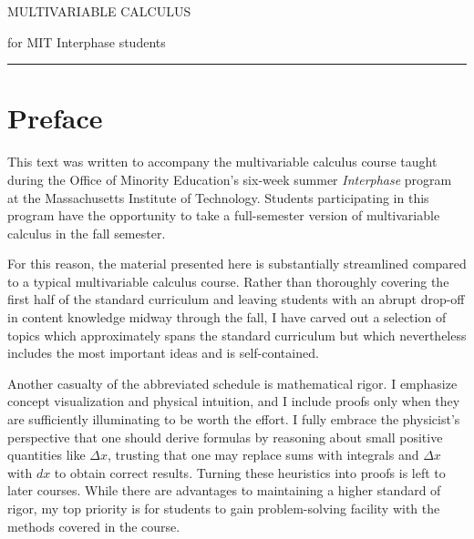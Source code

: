 \documentclass[svgnames]{report}
\begin{document}
 

\begin{titlepage} 
  \pagecolor{softblue}
  {\titlefont \color{MidnightBlue} MULTIVARIABLE CALCULUS} 
  
  \vspace*{5mm} 
  { \hspace*{9cm} \subtitlefont for MIT Interphase students} \par
  \null\vfill
  \vspace*{1cm}
  \noindent
  \hfill
  \begin{minipage}{0.35\linewidth}
    \begin{flushright}
      \printauthor
    \end{flushright}
  \end{minipage}
  \begin{minipage}{0.02\linewidth}
    \rule{1pt}{125pt}
  \end{minipage}
  \titlepagedecoration
\end{titlepage}


\chapter*{Preface} 

\pagecolor{white} 

This text was written to accompany the multivariable calculus course
taught during the Office of Minority Education's six-week summer
\textit{Interphase} program at the Massachusetts Institute of
Technology. Students participating in this program have the
opportunity to take a full-semester version of multivariable calculus
in the fall semester. 

For this reason, the material presented here is substantially
streamlined compared to a typical multivariable calculus
course. Rather than thoroughly covering the first half of the standard
curriculum and leaving students with an abrupt drop-off in content
knowledge midway through the fall, I have carved out a selection of
topics which approximately spans the standard curriculum but which 
nevertheless includes the most important ideas and is self-contained.

Another casualty of the abbreviated schedule is mathematical rigor. I
emphasize concept visualization and physical intuition, and I include
proofs only when they are sufficiently illuminating to be worth the
effort. I fully embrace the physicist's perspective that one should
derive formulas by reasoning about small positive quantities like
$\Delta x$, trusting that one may replace sums with integrals and
$\Delta x$ with $dx$ to obtain correct results. Turning these
heuristics into proofs is left to later courses. While there are
advantages to maintaining a higher standard of rigor, my top priority
is for students to gain problem-solving facility with the methods
covered in the course.
\end{document}

